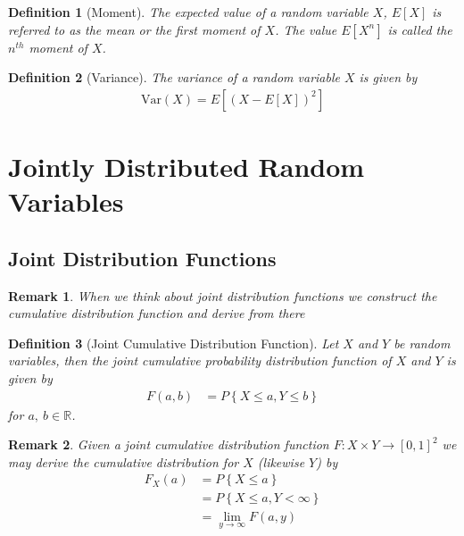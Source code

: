 \documentclass[11pt, oneside]{book}   	%
\newtheorem{definition}{Definition}[chapter]
\newtheorem{remark}{Remark}[chapter]
\newcommand{\set}[1]{\left\{#1\right\}}
\newcommand{\var}[1]{\mathrm{Var}\left(#1\right)}
\begin{document}
\begin{spacing}{1.618}
\begin{definition}[Moment]
	The expected value of a random variable $X$, $E[X]$ is referred to as the \emph{mean} or the first \emph{moment} of $X$. The value $E\left[X^n\right]$ is called the $n^{th}$ moment of $X$. 
\end{definition}

\begin{definition}[Variance]
	The \emph{variance} of a random variable $X$ is given by 
	\begin{alignat}{4}
		\var{X}=E\left[\left(X-E[X]\right)^2\right]
	\end{alignat}
\end{definition}

\section{Jointly Distributed Random Variables}

\subsection{Joint Distribution Functions}

\begin{remark}
	When we think about joint distribution functions we construct the cumulative distribution function and derive from there
\end{remark}

\begin{definition}[Joint Cumulative Distribution Function]
	Let $X$ and $Y$ be random variables, then the \emph{joint cumulative probability distribution function} of $X$ and $Y$ is given by
	\begin{alignat}{4}
		F(a, b)&=P\set{X\leq a, Y\leq b}
	\end{alignat}
	for $a,~b\in\mathbb{R}$. 
\end{definition}

\begin{remark}
	Given a joint cumulative distribution function $F:X\times Y\to [0,1]^2$ we may derive the cumulative distribution for $X$ (likewise $Y$) by 
	\begin{alignat}{4}
		F_X(a)&=P\set{X\leq a} \\
			&=P\set{X\leq a, Y<\infty} \\
			&=\lim_{y\to\infty}F(a, y)
	\end{alignat}
\end{remark}


\end{spacing}
\end{document}
